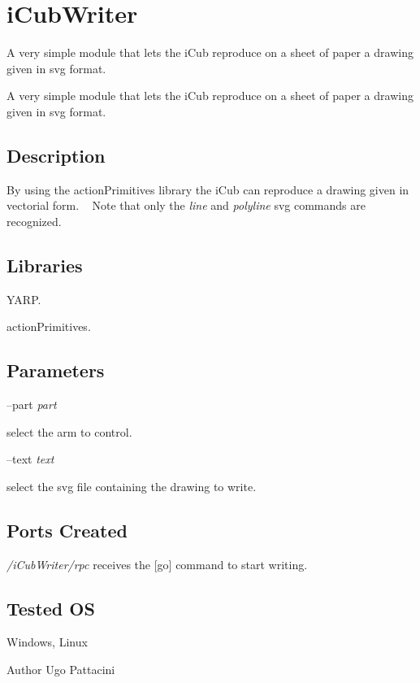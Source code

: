 \section{i\+Cub\+Writer}
\label{group__icub__iCubWriter}


A very simple module that lets the i\+Cub reproduce on a sheet of paper a drawing given in svg format.  


A very simple module that lets the i\+Cub reproduce on a sheet of paper a drawing given in svg format. 

\hypertarget{group__icub__tld_intro_sec}{}\subsection{Description}\label{group__icub__tld_intro_sec}
By using the action\+Primitives library the i\+Cub can reproduce a drawing given in vectorial form. ~\newline
 Note that only the {\itshape line} and {\itshape polyline} svg commands are recognized. ~\newline
\hypertarget{group__icub__tld_lib_sec}{}\subsection{Libraries}\label{group__icub__tld_lib_sec}

\begin{DoxyItemize}
\item Y\+A\+R\+P.
\item action\+Primitives.
\end{DoxyItemize}\hypertarget{group__icub__tld_parameters_sec}{}\subsection{Parameters}\label{group__icub__tld_parameters_sec}
--part {\itshape part} 
\begin{DoxyItemize}
\item select the arm to control.
\end{DoxyItemize}

--text {\itshape text} 
\begin{DoxyItemize}
\item select the svg file containing the drawing to write.
\end{DoxyItemize}\hypertarget{group__icub__tld_portsc_sec}{}\subsection{Ports Created}\label{group__icub__tld_portsc_sec}
{\itshape /i\+Cub\+Writer/rpc} receives the \mbox{[}go\mbox{]} command to start writing.\hypertarget{group__icub__tld_tested_os_sec}{}\subsection{Tested O\+S}\label{group__icub__tld_tested_os_sec}
Windows, Linux

\begin{DoxyAuthor}{Author}
Ugo Pattacini 
\end{DoxyAuthor}
